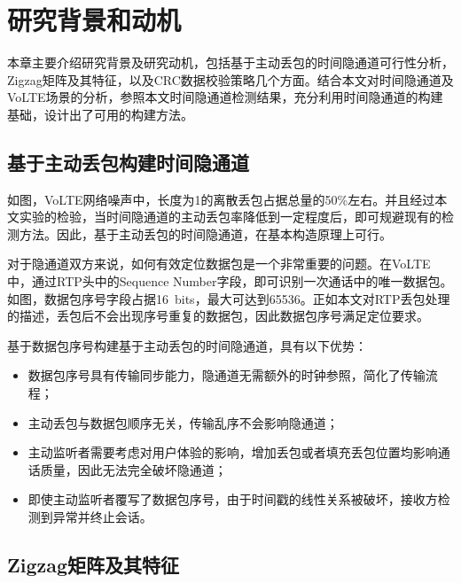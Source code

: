 \section{研究背景和动机}
\label{chap:zigzag:motivation}

本章主要介绍研究背景及研究动机，包括基于主动丢包的时间隐通道可行性分析，Zigzag矩阵及其特征，以及CRC数据校验策略几个方面。结合本文对时间隐通道及VoLTE场景的分析，参照本文时间隐通道检测结果，充分利用时间隐通道的构建基础，设计出了可用的构建方法。

\subsection{基于主动丢包构建时间隐通道}
\label{chap:zigzag:motivation:dropout}
如图，VoLTE网络噪声中，长度为1的离散丢包占据总量的50\%左右。并且经过本文实验的检验，当时间隐通道的主动丢包率降低到一定程度后，即可规避现有的检测方法。因此，基于主动丢包的时间隐通道，在基本构造原理上可行。

对于隐通道双方来说，如何有效定位数据包是一个非常重要的问题。在VoLTE中，通过RTP头中的Sequence Number字段，即可识别一次通话中的唯一数据包。如图，数据包序号字段占据{16\ bits}，最大可达到65536。正如本文对RTP丢包处理的描述，丢包后不会出现序号重复的数据包，因此数据包序号满足定位要求。

基于数据包序号构建基于主动丢包的时间隐通道，具有以下优势：
\begin{itemize}
    \item 数据包序号具有传输同步能力，隐通道无需额外的时钟参照，简化了传输流程；
    \item 主动丢包与数据包顺序无关，传输乱序不会影响隐通道；
    \item 主动监听者需要考虑对用户体验的影响，增加丢包或者填充丢包位置均影响通话质量，因此无法完全破坏隐通道；
    \item 即使主动监听者覆写了数据包序号，由于时间戳的线性关系被破坏，接收方检测到异常并终止会话。
\end{itemize}

\subsection{Zigzag矩阵及其特征}
\label{chap:zigzag:motivation:zigzag}

